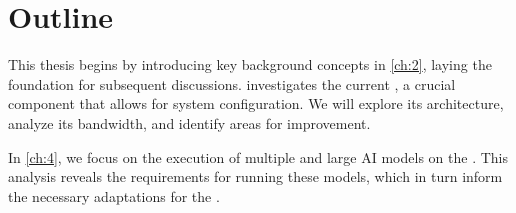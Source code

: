 \section{Outline}

This thesis begins by introducing key background concepts in \cref{ch:2}, laying the foundation for subsequent discussions.
 investigates the current \confignoc{}, a crucial component that allows for system configuration.
We will explore its architecture, analyze its bandwidth, and identify areas for improvement.

In \cref{ch:4}, we focus on the execution of multiple and large AI models on the \graicore{}.
This analysis reveals the requirements for running these models, which in turn inform the necessary adaptations for the \confignoc{}.

